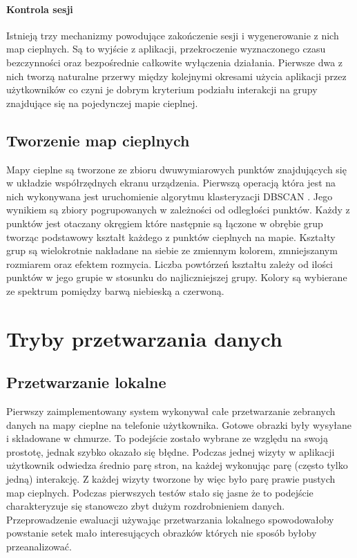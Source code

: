 
\paragraph{Kontrola sesji}
Istnieją trzy mechanizmy powodujące zakończenie sesji i wygenerowanie z nich map cieplnych. Są to wyjście z aplikacji, przekroczenie wyznaczonego czasu bezczynności oraz bezpośrednie całkowite wyłączenia działania. Pierwsze dwa z nich tworzą naturalne przerwy między kolejnymi okresami użycia aplikacji przez użytkowników co czyni je dobrym kryterium podziału interakcji na grupy znajdujące się na pojedynczej mapie cieplnej.

\subsection{Tworzenie map cieplnych}
Mapy cieplne są tworzone ze zbioru dwuwymiarowych punktów znajdujących się w układzie współrzędnych ekranu urządzenia. Pierwszą operacją która jest na nich wykonywana jest uruchomienie algorytmu klasteryzacji DBSCAN \cite{DBSCAN_Wiki}. Jego wynikiem są zbiory pogrupowanych w zależności od odległości punktów. Każdy z punktów jest otaczany okręgiem które następnie są łączone w obrębie grup tworząc podstawowy kształt każdego z punktów cieplnych na mapie. Kształty grup są wielokrotnie nakładane na siebie ze zmiennym kolorem, zmniejszanym rozmiarem oraz efektem rozmycia. Liczba powtórzeń kształtu zależy od ilości punktów w jego grupie w stosunku do najliczniejszej grupy. Kolory są wybierane ze spektrum pomiędzy barwą niebieską a czerwoną. 


\section{Tryby przetwarzania danych}

\subsection{Przetwarzanie lokalne}
Pierwszy zaimplementowany system wykonywał całe przetwarzanie zebranych danych na mapy cieplne na telefonie użytkownika. Gotowe obrazki były wysyłane i składowane w chmurze. To podejście zostało wybrane ze względu na swoją prostotę, jednak szybko okazało się błędne. Podczas jednej wizyty w aplikacji  użytkownik odwiedza średnio parę stron, na każdej wykonując parę (często tylko jedną) interakcję. Z każdej wizyty tworzone by więc było parę prawie pustych map cieplnych. Podczas pierwszych testów stało się jasne że to podejście charakteryzuje się stanowczo zbyt dużym rozdrobnieniem danych. Przeprowadzenie ewaluacji używając przetwarzania lokalnego spowodowałoby powstanie setek mało interesujących obrazków których nie sposób byłoby przeanalizować.

